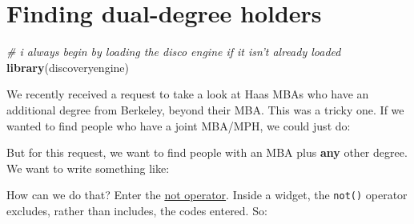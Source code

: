 \documentclass[]{book}
\newenvironment{Shaded}{\begin{snugshade}}{\end{snugshade}}
\newcommand{\CommentTok}[1]{\textcolor[rgb]{0.56,0.35,0.01}{\textit{#1}}}
\newcommand{\KeywordTok}[1]{\textcolor[rgb]{0.13,0.29,0.53}{\textbf{#1}}}
\newcommand{\NormalTok}[1]{#1}
\newcommand{\OperatorTok}[1]{\textcolor[rgb]{0.81,0.36,0.00}{\textbf{#1}}}
\newcommand{\StringTok}[1]{\textcolor[rgb]{0.31,0.60,0.02}{#1}}
\begin{document}
\hypertarget{ex-mba-dual}{%
\chapter{Finding dual-degree holders}\label{ex-mba-dual}}

\begin{Shaded}
\begin{Highlighting}[]
\CommentTok{# i always begin by loading the disco engine if it isn't already loaded}
\KeywordTok{library}\NormalTok{(discoveryengine)}
\end{Highlighting}
\end{Shaded}

We recently received a request to take a look at Haas MBAs who have an additional degree from Berkeley, beyond their MBA. This was a tricky one. If we wanted to find people who have a joint MBA/MPH, we could just do:

\begin{Shaded}
\end{Shaded}

But for this request, we want to find people with an MBA plus \textbf{any} other degree. We want to write something like:

\begin{Shaded}
\end{Shaded}

How can we do that? Enter the \protect\hyperlink{widget-not-operator}{not operator}. Inside a widget, the \texttt{not()} operator excludes, rather than includes, the codes entered. So:

\begin{Shaded}
\end{Shaded}
\end{document}

